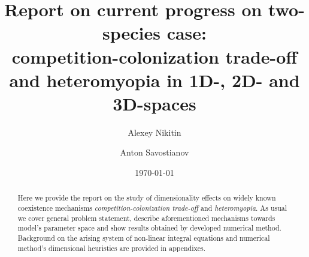 \documentclass[%
 aip,
rsi,%
 amsmath,amssymb,
 reprint,%
]{revtex4-1}
\begin{document}

\title{Report on current progress on two-species case: \\
competition-colonization trade-off and heteromyopia in 1D-, 2D- and 3D-spaces} %



\author{Alexey Nikitin}

\author{Anton Savostianov}




\date{\today}

\begin{abstract}
    Here we provide the report on the study of dimensionality effects on widely known coexistence mechanisms \emph{competition-colonization trade-off} and \emph{heteromyopia}. As usual we cover general problem statement, describe aforementioned mechanisms towards model's parameter space and show results obtained by developed numerical method. Background on the arising system of non-linear integral equations and numerical method's dimensional heuristics are provided in appendixes.
\end{abstract}

\pacs{}%
\end{document}
